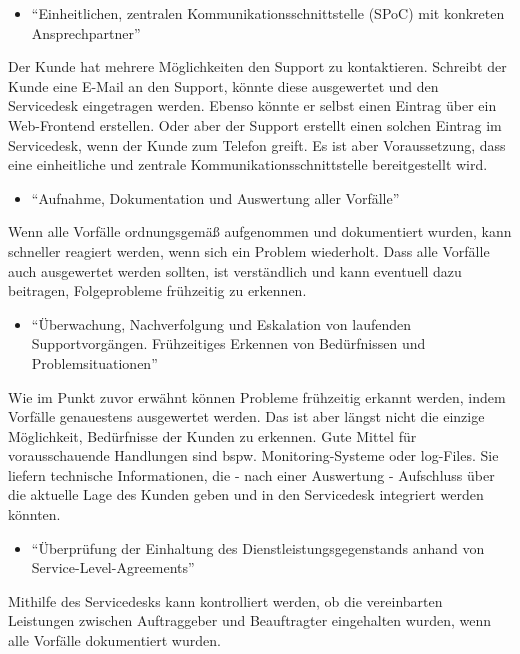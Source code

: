 \begin{itemize}
\item \enquote{Einheitlichen, zentralen Kommunikationsschnittstelle (SPoC) mit konkreten Ansprechpartner}
\end{itemize}
\noindent
Der Kunde hat mehrere Möglichkeiten den Support zu kontaktieren. Schreibt der Kunde eine E-Mail an den Support, könnte diese ausgewertet und den Servicedesk eingetragen werden. Ebenso könnte er selbst einen Eintrag über ein Web-Frontend erstellen. Oder aber der Support erstellt einen solchen Eintrag im Servicedesk, wenn der Kunde zum Telefon greift. Es ist aber Voraussetzung, dass eine einheitliche und zentrale Kommunikationsschnittstelle bereitgestellt wird.


\begin{itemize}
\item \enquote{Aufnahme, Dokumentation und Auswertung aller Vorfälle}
\end{itemize}
\noindent
Wenn alle Vorfälle ordnungsgemäß aufgenommen und dokumentiert wurden, kann schneller reagiert werden, wenn sich ein Problem wiederholt. Dass alle Vorfälle auch ausgewertet werden sollten, ist verständlich und kann eventuell dazu beitragen, Folgeprobleme frühzeitig zu erkennen.

\begin{itemize}
\item \enquote{Überwachung, Nachverfolgung und Eskalation von laufenden
Supportvorgängen. Frühzeitiges Erkennen von
Bedürfnissen und Problemsituationen}
\end{itemize}
\noindent
Wie im Punkt zuvor erwähnt können Probleme frühzeitig erkannt werden, indem Vorfälle genauestens ausgewertet werden. Das ist aber längst nicht die einzige Möglichkeit, Bedürfnisse der Kunden zu erkennen. Gute Mittel für vorausschauende Handlungen sind  bspw. Monitoring-Systeme oder log-Files. Sie liefern technische Informationen, die - nach einer Auswertung - Aufschluss über die aktuelle Lage des Kunden geben und in den Servicedesk integriert werden könnten.


\begin{itemize}
\item \enquote{Überprüfung der Einhaltung des Dienstleistungsgegenstands
anhand von Service-Level-Agreements}
\end{itemize}
\noindent
Mithilfe des Servicedesks kann kontrolliert werden, ob die vereinbarten Leistungen zwischen Auftraggeber und Beauftragter eingehalten wurden, wenn alle Vorfälle dokumentiert wurden.

